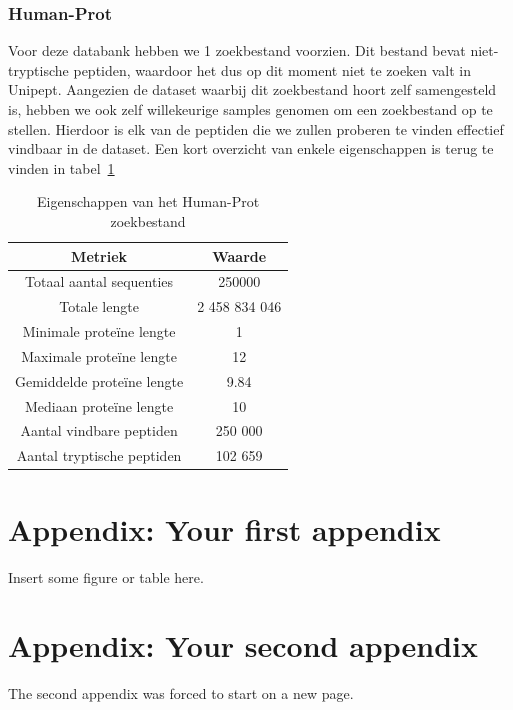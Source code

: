 \documentclass[11pt,dutch,faculty=we,layout=titlefont,underline=false,titleUppercase=true,titleUnderline=true]{ugent2016-report}
\begin{document}
    \subsubsection{Human-Prot}
    Voor deze databank hebben we 1 zoekbestand voorzien.
    Dit bestand bevat niet-tryptische peptiden, waardoor het dus op dit moment niet te zoeken valt in Unipept.
    Aangezien de dataset waarbij dit zoekbestand hoort zelf samengesteld is, hebben we ook zelf willekeurige samples genomen om een zoekbestand op te stellen.
    Hierdoor is elk van de peptiden die we zullen proberen te vinden effectief vindbaar in de dataset.
    Een kort overzicht van enkele eigenschappen is terug te vinden in tabel~\ref{tab:humanprot_zoekbestand}

    \begin{table}[h!]
        \centering
        \begin{tabular}{ c c }
            Metriek                    & Waarde        \\
            \hline\hline
            Totaal aantal sequenties   & 250000        \\
            Totale lengte              & 2 458 834 046 \\
            Minimale proteïne lengte   & 1             \\
            Maximale proteïne lengte   & 12            \\
            Gemiddelde proteïne lengte & 9.84          \\
            Mediaan proteïne lengte    & 10            \\
            Aantal vindbare peptiden   & 250 000       \\
            Aantal tryptische peptiden & 102 659       \\
            \hline
        \end{tabular}
        \caption{Eigenschappen van het Human-Prot zoekbestand}
        \label{tab:humanprot_zoekbestand}
    \end{table}

    


    \printbibliography[heading=bibintoc,title={Referenties}] %


    \appendix


    \section{Appendix: Your first appendix}
    Insert some figure or table here.

    \newpage


    \section{Appendix: Your second appendix}
    The second appendix was forced to start on a new page.
\end{document}
